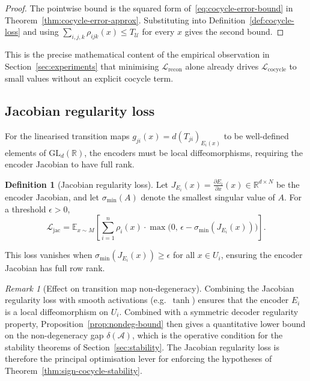 \documentclass[11pt]{article}
\newcommand{\R}{\mathbb{R}}
\newcommand{\GL}{\mathrm{GL}}
\theoremstyle{plain}
\theoremstyle{definition}
\newtheorem{definition}[theorem]{Definition}
\theoremstyle{remark}
\newtheorem{remark}[theorem]{Remark}
\begin{document}
\begin{proof}
The pointwise bound is the squared form of~\eqref{eq:cocycle-error-bound} in Theorem~\ref{thm:cocycle-error-approx}. Substituting into Definition~\ref{def:cocycle-loss} and using $\sum_{i,j,k} \rho_{ijk}(x) \leq T_{\mathcal{U}}$ for every $x$ gives the second bound.
\end{proof}

This is the precise mathematical content of the empirical observation in Section~\ref{sec:experiments} that minimising $\mathcal{L}_{\mathrm{recon}}$ alone already drives $\mathcal{L}_{\mathrm{cocycle}}$ to small values without an explicit cocycle term.

\subsection*{Jacobian regularity loss}

For the linearised transition maps $g_{ji}(x) = d(T_{ji})_{E_i(x)}$ to be well-defined elements of $\GL_d(\R)$, the encoders must be local diffeomorphisms, requiring the encoder Jacobian to have full rank.

\begin{definition}[Jacobian regularity loss]\label{def:jac-loss}
Let $J_{E_i}(x) = \frac{\partial E_i}{\partial x}(x) \in \R^{d \times N}$ be the encoder Jacobian, and let $\sigma_{\min}(A)$ denote the smallest singular value of $A$. For a threshold $\epsilon > 0$,
\[
\mathcal{L}_{\mathrm{jac}} = \mathbb{E}_{x \sim M}\left[ \sum_{i=1}^{n} \rho_i(x) \cdot \max\bigl( 0,\, \epsilon - \sigma_{\min}(J_{E_i}(x)) \bigr) \right].
\]
\end{definition}

This loss vanishes when $\sigma_{\min}(J_{E_i}(x)) \geq \epsilon$ for all $x \in U_i$, ensuring the encoder Jacobian has full row rank.

\begin{remark}[Effect on transition map non-degeneracy]
Combining the Jacobian regularity loss with smooth activations (e.g.\ $\tanh$) ensures that the encoder $E_i$ is a local diffeomorphism on $U_i$. Combined with a symmetric decoder regularity property, Proposition~\ref{prop:nondeg-bound} then gives a quantitative lower bound on the non-degeneracy gap $\delta(\mathcal{A})$, which is the operative condition for the stability theorems of Section~\ref{sec:stability}. The Jacobian regularity loss is therefore the principal optimisation lever for enforcing the hypotheses of Theorem~\ref{thm:sign-cocycle-stability}.
\end{remark}
\end{document}
